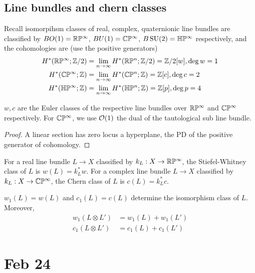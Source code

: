 \documentclass[12pt]{article}
\begin{document}
\subsection{Line bundles and chern classes}
Recall isomorpihsm classes of real, complex, quaternionic line bundles are classified by $BO(1) = \mathbb{R}\mathbb{P}^\infty$, $BU(1) = \mathbb{C}\mathbb{P}^\infty$, $B\operatorname{SU}(2) = \mathbb{H}\mathbb{P}^\infty$ respectively, and the cohomologies are (use the positive generators)
\begin{align*}
    H^*(\mathbb{R}\mathbb{P}^\infty; \mathbb{Z}/2) &= \lim_{n\to\infty} H^*(\mathbb{R}\mathbb{P}^n; \mathbb{Z}/2) = \mathbb{Z}/2[w], \deg w = 1 \\
    H^*(\mathbb{C}\mathbb{P}^\infty; \mathbb{Z}) &= \lim_{n\to\infty} H^*(\mathbb{C}\mathbb{P}^n; \mathbb{Z}) = \mathbb{Z}[c], \deg c = 2 \\
    H^*(\mathbb{H}\mathbb{P}^\infty; \mathbb{Z}) &= \lim_{n\to\infty} H^*(\mathbb{H}\mathbb{P}^n; \mathbb{Z}) = \mathbb{Z}[p], \deg p = 4
\end{align*}

\begin{proposition}
    $w,c$ are the Euler classes of the respective line bundles over $\mathbb{R}\mathbb{P}^\infty$ and $\mathbb{C}\mathbb{P}^\infty$ respectively. For $\mathbb{C}\mathbb{P}^\infty$, we use ${\mathcal{O}}(1)$ the dual of the tautological sub line bundle. 
\end{proposition}

\begin{proof}
    A linear section has zero locus a hyperplane, the PD of the positive generator of cohomology.
\end{proof}

\begin{definition}
    For a real line bundle $L\to X$ classified by $k_L: X \to \mathbb{R}\mathbb{P}^\infty$, the Stiefel-Whitney class of $L$ is $w(L) = k_L^* w$. For a complex line bundle $L\to X$ classified by $k_L: X \to \mathbb{C}\mathbb{P}^\infty$, the Chern class of $L$ is $c(L) = k_L^* c$. 
\end{definition}

\begin{theorem}
    $w_1(L) = w(L)$ and $c_1(L) = c(L)$ determine the isomorphism class of $L$. Moreover, \begin{align*}
        w_1(L\otimes L') &= w_1(L) + w_1(L') \\
        c_1(L\otimes L') &= c_1(L) + c_1(L')
    \end{align*}
\end{theorem}

\section{Feb 24}
\end{document}
